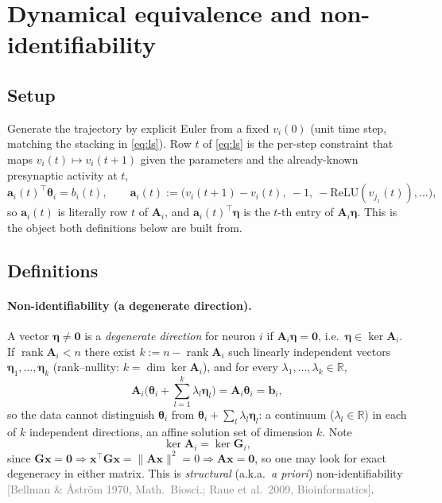 \documentclass[11pt]{article}
\newcommand{\Mat}[1]{\mathbf{#1}}
\newcommand{\A}{\Mat{A}}
\newcommand{\thet}{\boldsymbol{\theta}}
\DeclareMathOperator{\rank}{rank}
\newcommand{\src}[1]{{\footnotesize\textcolor{gray}{[#1]}}}
\begin{document}
\section{Dynamical equivalence and non-identifiability}
\label{sec:kernel}

\subsection{Setup}

Generate the trajectory by explicit Euler from a fixed $v_i(0)$ (unit time
step, matching the stacking in \eqref{eq:ls}). Row $t$ of \eqref{eq:ls} is
the per-step constraint that maps $v_i(t)\mapsto v_i(t+1)$ given the
parameters and the already-known presynaptic activity at $t$,
\begin{equation}
\Mat a_i(t)^{\!\top}\thet_i = b_i(t), \qquad
\Mat a_i(t) := \big(v_i(t{+}1)-v_i(t),\ -1,\ -\mathrm{ReLU}(v_{j_1}(t)),\dots\big) ,
\label{eq:row}
\end{equation}
so $\Mat a_i(t)$ is literally row $t$ of $\A_i$, and $\Mat
a_i(t)^{\!\top}\boldsymbol\eta$ is the $t$-th entry of $\A_i\boldsymbol\eta$.
This is the object both definitions below are built from.

\subsection{Definitions}

\paragraph{Non-identifiability (a degenerate direction).} A vector
$\boldsymbol\eta\neq\Mat 0$ is a \emph{degenerate direction} for neuron $i$ if
$\A_i\boldsymbol\eta=\Mat 0$, i.e.\ $\boldsymbol\eta\in\ker\A_i$. If $\rank
\A_i<n$ there exist $k:=n-\rank\A_i$ such linearly independent vectors
$\boldsymbol\eta_1,\dots,\boldsymbol\eta_k$ (rank--nullity: $k=\dim\ker\A_i$),
and for every $\lambda_1,\dots,\lambda_k\in\mathbb R$,
\begin{equation}
\A_i\Big(\thet_i + \textstyle\sum_{l=1}^k \lambda_l\boldsymbol\eta_l\Big) = \A_i\thet_i = \Mat b_i ,
\label{eq:kernel}
\end{equation}
so the data cannot distinguish $\thet_i$ from $\thet_i+\sum_l\lambda_l\boldsymbol\eta_l$:
a continuum ($\lambda_l\in\mathbb R$) in each of $k$ independent directions,
an affine solution set of dimension $k$. Note
\begin{equation}
\ker \A_i = \ker \Mat G_i ,
\label{eq:kereq}
\end{equation}
since $\Mat G\Mat x = \Mat 0 \Rightarrow \Mat x^{\!\top}\Mat G\Mat x =
\|\A\Mat x\|^2 = 0 \Rightarrow \A\Mat x = \Mat 0$, so one may look for exact
degeneracy in either matrix. This is \emph{structural} (a.k.a.\ \emph{a
priori}) non-identifiability \src{Bellman \& Åström 1970, Math.\ Biosci.;
Raue et al.\ 2009, Bioinformatics}.
\end{document}

